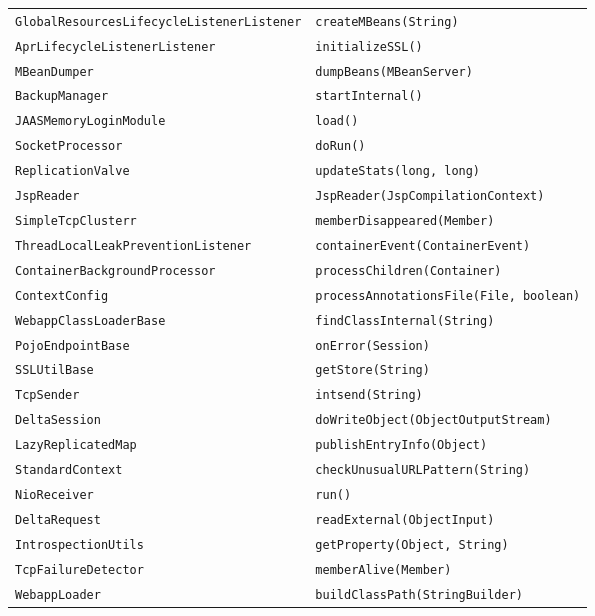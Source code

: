 \begin{center}
\begin{longtable}{ll}
\lstinline/GlobalResourcesLifecycleListenerListener/&{\lstinline/createMBeans(String)/}\\
\lstinline/AprLifecycleListenerListener/&{\lstinline/initializeSSL()/}\\
\lstinline/MBeanDumper/&{\lstinline/dumpBeans(MBeanServer)/}\\
\lstinline/BackupManager/&{\lstinline/startInternal()/}\\
\lstinline/JAASMemoryLoginModule/&{\lstinline/load()/}\\
\lstinline/SocketProcessor/&{\lstinline/doRun()/}\\
\lstinline/ReplicationValve/&{\lstinline/updateStats(long, long)/}\\
\lstinline/JspReader/&{\lstinline/JspReader(JspCompilationContext)/}\\
\lstinline/SimpleTcpClusterr/&{\lstinline/memberDisappeared(Member)/}\\
\lstinline/ThreadLocalLeakPreventionListener/&{\lstinline/containerEvent(ContainerEvent)/}\\
\lstinline/ContainerBackgroundProcessor/&{\lstinline/processChildren(Container)/}\\
\lstinline/ContextConfig/&{\lstinline/processAnnotationsFile(File, boolean)/}\\
\lstinline/WebappClassLoaderBase/&{\lstinline/findClassInternal(String)/}\\
\lstinline/PojoEndpointBase/&{\lstinline/onError(Session)/}\\
\lstinline/SSLUtilBase/&{\lstinline/getStore(String)/}\\
\lstinline/TcpSender/&{\lstinline/intsend(String)/}\\
\lstinline/DeltaSession/&{\lstinline/doWriteObject(ObjectOutputStream)/}\\
\lstinline/LazyReplicatedMap/&{\lstinline/publishEntryInfo(Object)/}\\
\lstinline/StandardContext/&{\lstinline/checkUnusualURLPattern(String)/}\\
\lstinline/NioReceiver/&{\lstinline/run()/}\\
\lstinline/DeltaRequest/&{\lstinline/readExternal(ObjectInput)/}\\
\lstinline/IntrospectionUtils/&{\lstinline/getProperty(Object, String)/}\\
\lstinline/TcpFailureDetector/&{\lstinline/memberAlive(Member)/}\\
\lstinline/WebappLoader/&{\lstinline/buildClassPath(StringBuilder)/}\\

\end{longtable}
\end{center}
